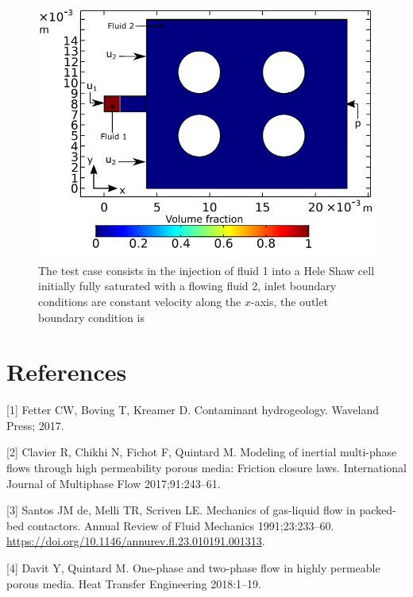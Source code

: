 \documentclass[]{article}
\begin{document}
\begin{figure}
\hypertarget{fig:testCase}{%
\centering
\includegraphics{figures/pdf/TestCase_validation.pdf}
\caption{The test case consists in the injection of fluid 1 into a Hele
Shaw cell initially fully saturated with a flowing fluid 2, inlet
boundary conditions are constant velocity along the \(x\)-axis, the
outlet boundary condition is}\label{fig:testCase}
}
\end{figure}

\hypertarget{references}{%
\section*{References}\label{references}}

\hypertarget{refs}{}
\leavevmode\hypertarget{ref-fetter2017contaminant}{}%
{[}1{]} Fetter CW, Boving T, Kreamer D. Contaminant hydrogeology.
Waveland Press; 2017.

\leavevmode\hypertarget{ref-clavier2017modeling}{}%
{[}2{]} Clavier R, Chikhi N, Fichot F, Quintard M. Modeling of inertial
multi-phase flows through high permeability porous media: Friction
closure laws. International Journal of Multiphase Flow 2017;91:243--61.

\leavevmode\hypertarget{ref-Santos1991}{}%
{[}3{]} Santos JM de, Melli TR, Scriven LE. Mechanics of gas-liquid flow
in packed-bed contactors. Annual Review of Fluid Mechanics
1991;23:233--60.
\url{https://doi.org/10.1146/annurev.fl.23.010191.001313}.

\leavevmode\hypertarget{ref-davit2018one}{}%
{[}4{]} Davit Y, Quintard M. One-phase and two-phase flow in highly
permeable porous media. Heat Transfer Engineering 2018:1--19.
\end{document}
